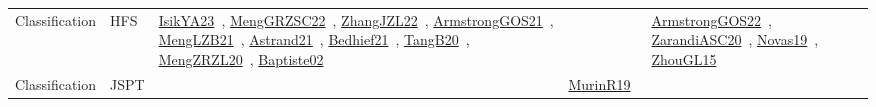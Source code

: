 {\begin{longtable}{lp{3cm}>{\raggedright\arraybackslash}p{6cm}>{\raggedright\arraybackslash}p{6cm}>{\raggedright\arraybackslash}p{8cm}}
Classification & HFS & \href{../works/IsikYA23.pdf}{IsikYA23}~\cite{IsikYA23}, \href{../works/MengGRZSC22.pdf}{MengGRZSC22}~\cite{MengGRZSC22}, \href{../works/ZhangJZL22.pdf}{ZhangJZL22}~\cite{ZhangJZL22}, \href{../works/ArmstrongGOS21.pdf}{ArmstrongGOS21}~\cite{ArmstrongGOS21}, \href{../works/MengLZB21.pdf}{MengLZB21}~\cite{MengLZB21}, \href{../works/Astrand21.pdf}{Astrand21}~\cite{Astrand21}, \href{../works/Bedhief21.pdf}{Bedhief21}~\cite{Bedhief21}, \href{../works/TangB20.pdf}{TangB20}~\cite{TangB20}, \href{../works/MengZRZL20.pdf}{MengZRZL20}~\cite{MengZRZL20}, \href{../works/Baptiste02.pdf}{Baptiste02}~\cite{Baptiste02} &  & \href{../works/ArmstrongGOS22.pdf}{ArmstrongGOS22}~\cite{ArmstrongGOS22}, \href{../works/ZarandiASC20.pdf}{ZarandiASC20}~\cite{ZarandiASC20}, \href{../works/Novas19.pdf}{Novas19}~\cite{Novas19}, \href{../works/ZhouGL15.pdf}{ZhouGL15}~\cite{ZhouGL15}\\
Classification & JSPT &  & \href{../works/MurinR19.pdf}{MurinR19}~\cite{MurinR19} & \\

\end{longtable}}
